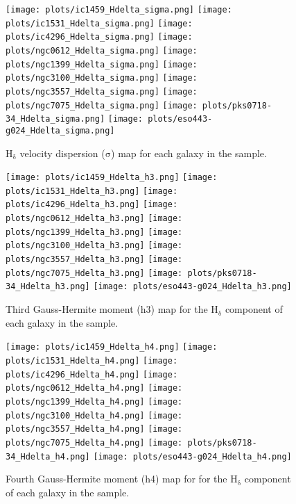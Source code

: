 \documentclass[fleqn,usenatbib,useAMS]{mnras}
\begin{document}
		\begin{figure*}
			\centering
			\texttt{[image: plots/ic1459\_Hdelta\_sigma.png]}
			\texttt{[image: plots/ic1531\_Hdelta\_sigma.png]}
			\texttt{[image: plots/ic4296\_Hdelta\_sigma.png]}
			\texttt{[image: plots/ngc0612\_Hdelta\_sigma.png]}
			\texttt{[image: plots/ngc1399\_Hdelta\_sigma.png]}
			\texttt{[image: plots/ngc3100\_Hdelta\_sigma.png]}
			\texttt{[image: plots/ngc3557\_Hdelta\_sigma.png]}
			\texttt{[image: plots/ngc7075\_Hdelta\_sigma.png]}
			\texttt{[image: plots/pks0718-34\_Hdelta\_sigma.png]}
			\texttt{[image: plots/eso443-g024\_Hdelta\_sigma.png]}
			\caption{H$_\mathrm{\delta}$ velocity dispersion ($\mathrm{\sigma}$) map for each galaxy in the sample.}
			\label{fig:Hdelta_sigma}
		\end{figure*}


		\begin{figure*}
			\centering
			\texttt{[image: plots/ic1459\_Hdelta\_h3.png]}
			\texttt{[image: plots/ic1531\_Hdelta\_h3.png]}
			\texttt{[image: plots/ic4296\_Hdelta\_h3.png]}
			\texttt{[image: plots/ngc0612\_Hdelta\_h3.png]}
			\texttt{[image: plots/ngc1399\_Hdelta\_h3.png]}
			\texttt{[image: plots/ngc3100\_Hdelta\_h3.png]}
			\texttt{[image: plots/ngc3557\_Hdelta\_h3.png]}
			\texttt{[image: plots/ngc7075\_Hdelta\_h3.png]}
			\texttt{[image: plots/pks0718-34\_Hdelta\_h3.png]}
			\texttt{[image: plots/eso443-g024\_Hdelta\_h3.png]}
			\caption{Third Gauss-Hermite moment (h3) map for the H$_\mathrm{\delta}$ component of each galaxy in the sample.}
			\label{fig:Hdelta_h3}
		\end{figure*}

		\begin{figure*}
			\centering
			\texttt{[image: plots/ic1459\_Hdelta\_h4.png]}
			\texttt{[image: plots/ic1531\_Hdelta\_h4.png]}
			\texttt{[image: plots/ic4296\_Hdelta\_h4.png]}
			\texttt{[image: plots/ngc0612\_Hdelta\_h4.png]}
			\texttt{[image: plots/ngc1399\_Hdelta\_h4.png]}
			\texttt{[image: plots/ngc3100\_Hdelta\_h4.png]}
			\texttt{[image: plots/ngc3557\_Hdelta\_h4.png]}
			\texttt{[image: plots/ngc7075\_Hdelta\_h4.png]}
			\texttt{[image: plots/pks0718-34\_Hdelta\_h4.png]}
			\texttt{[image: plots/eso443-g024\_Hdelta\_h4.png]}
			\caption{Fourth Gauss-Hermite moment (h4) map for for the H$_\mathrm{\delta}$ component of each galaxy in the sample.}
			\label{fig:Hdelta_h4}
		\end{figure*}
\end{document}
